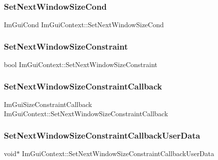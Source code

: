 \subsubsection{\texorpdfstring{Set\+Next\+Window\+Size\+Cond}{SetNextWindowSizeCond}}
{\footnotesize\ttfamily Im\+Gui\+Cond Im\+Gui\+Context\+::\+Set\+Next\+Window\+Size\+Cond}

\hypertarget{struct_im_gui_context_a9d2204e10eb23d9ab8aa653b555fb851}{}\label{struct_im_gui_context_a9d2204e10eb23d9ab8aa653b555fb851} 
\subsubsection{\texorpdfstring{Set\+Next\+Window\+Size\+Constraint}{SetNextWindowSizeConstraint}}
{\footnotesize\ttfamily bool Im\+Gui\+Context\+::\+Set\+Next\+Window\+Size\+Constraint}

\hypertarget{struct_im_gui_context_a304a1bfd5dbcebee45ba8cdfa5d231cb}{}\label{struct_im_gui_context_a304a1bfd5dbcebee45ba8cdfa5d231cb} 
\subsubsection{\texorpdfstring{Set\+Next\+Window\+Size\+Constraint\+Callback}{SetNextWindowSizeConstraintCallback}}
{\footnotesize\ttfamily Im\+Gui\+Size\+Constraint\+Callback Im\+Gui\+Context\+::\+Set\+Next\+Window\+Size\+Constraint\+Callback}

\hypertarget{struct_im_gui_context_a5da8374c369cff287b16ac7d8e3a7901}{}\label{struct_im_gui_context_a5da8374c369cff287b16ac7d8e3a7901} 
\subsubsection{\texorpdfstring{Set\+Next\+Window\+Size\+Constraint\+Callback\+User\+Data}{SetNextWindowSizeConstraintCallbackUserData}}
{\footnotesize\ttfamily void$\ast$ Im\+Gui\+Context\+::\+Set\+Next\+Window\+Size\+Constraint\+Callback\+User\+Data}

